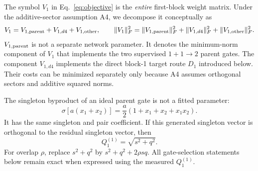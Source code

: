 \documentclass[10pt]{article}
\begin{document}
The symbol $V_1$ in Eq.~\eqref{eq:objective} is the \emph{entire} first-block weight matrix.
Under the additive-sector assumption A4, we decompose it conceptually as
\begin{equation}
V_1=V_{1,\rm parent}+V_{1,d4}+V_{1,\rm other},\qquad
\|V_1\|_F^2=\|V_{1,\rm parent}\|_F^2+
\|V_{1,d4}\|_F^2+\|V_{1,\rm other}\|_F^2.
\label{eq:v1-decomp}
\end{equation}
$V_{1,\rm parent}$ is not a separate network parameter.  It denotes the minimum-norm component
of $V_1$ that implements the two supervised $1+1\to2$ parent gates.  The component
$V_{1,d4}$ implements the direct block-1 target route $D_1$ introduced below.  Their costs can
be minimized separately only because A4 assumes orthogonal sectors and additive squared norms.

The singleton byproduct of an ideal parent gate is not a fitted parameter:
\begin{equation}
\sigma\!\left[a(x_1+x_2)\right]
=\frac a2(1+x_1+x_2+x_1x_2).
\label{eq:relu-decomp}
\end{equation}
It has the same singleton and pair coefficient.  If this generated singleton vector is
orthogonal to the residual singleton vector, then
\begin{equation}
Q_1^{(1)}=\sqrt{s^2+q^2}.
\label{eq:q1out}
\end{equation}
For overlap $\rho$, replace $s^2+q^2$ by $s^2+q^2+2\rho sq$.  All gate-selection statements
below remain exact when expressed using the measured $Q_1^{(1)}$.
\end{document}

